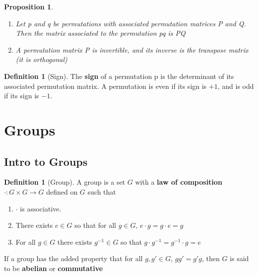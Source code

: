 \documentclass[12pt]{article}
\newtheorem{prop}[thm]{Proposition}
\theoremstyle{definition}
\newtheorem{defn}[thm]{Definition}
\theoremstyle{remark}
\numberwithin{equation}{section}
\newcommand\B[1]{\textbf{ #1}}
\begin{document}
\vspace{15pt}


\begin{prop}
        \begin{enumerate}
                \item Let p and q be permutations with associated permutation matrices P and Q. Then the matrix associated to the permutation pq is PQ
                \item A permutation matrix P is invertible, and its inverse is the transpose matrix (it is orthogonal)
        \end{enumerate}
\end{prop}

\vspace{15pt}


\begin{defn}[Sign]
        The \B{sign} of a permutation p is the determinant of its associated permutation matrix. A permutation is even if its sign is $+1$, and is odd if its sign is $-1$.
\end{defn}


\vspace{15pt}











\clearpage

\section{Groups}

\subsection{Intro to Groups}


\begin{defn}[Group]
        A group is a set $G$ with a \B{law of composition} $\cdot:G\times G \rightarrow G$ defined on $G$ such that \begin{enumerate}
                \item $\cdot$ is associative.
                \item There exists $e \in G$ so that for all $g \in G$, $e\cdot g = g \cdot e = g$
                \item For all $g \in G$ there exists $g^{-1} \in G$ so that $g\cdot g^{-1} = g^{-1} \cdot g = e$
        \end{enumerate}
        If a group has the added property that for all $g,g' \in G$, $gg' = g'g$, then $G$ is said to be \B{abelian} or \B{commutative}
\end{defn}
\end{document}
